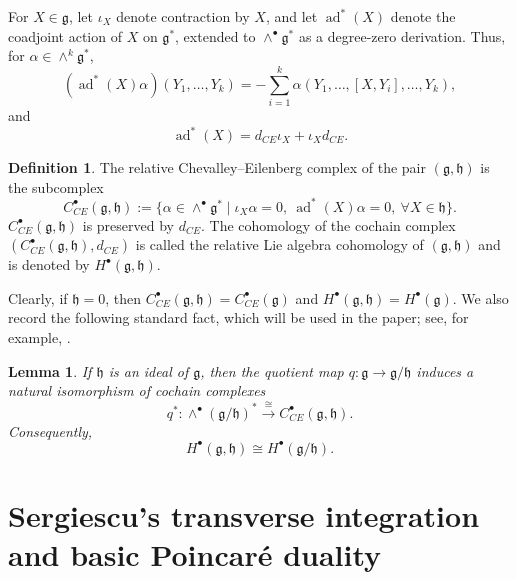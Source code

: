 \documentclass[reqno, 11pt]{amsart}
\newtheorem{lem}[thm]{Lemma}
\theoremstyle{definition}
\newtheorem{defn}[thm]{Definition}
\theoremstyle{property}
\theoremstyle{remark}
\numberwithin{equation}{section}
\begin{document}
For $X\in \mathfrak g$, let $\iota_X$ denote contraction by $X$, and let
$\operatorname{ad}^*(X)$ denote the coadjoint action of $X$ on
$\mathfrak g^*$, extended to $\wedge^\bullet \mathfrak g^*$ as a degree-zero
derivation. Thus, for $\alpha\in \wedge^k\mathfrak g^*$,
\[
(\operatorname{ad}^*(X)\alpha)(Y_1,\dots,Y_k)
=
-\sum_{i=1}^k
\alpha(Y_1,\dots,[X,Y_i],\dots,Y_k),
\]
and
\[
\operatorname{ad}^*(X)=d_{CE}\iota_X+\iota_X d_{CE}.
\]

\begin{defn}
The relative Chevalley--Eilenberg complex of the pair $(\mathfrak g,\mathfrak h)$
is the subcomplex
\[
C_{CE}^\bullet(\mathfrak g,\mathfrak h)
:=
\{\alpha\in \wedge^\bullet \mathfrak g^* \mid
\iota_X\alpha=0,\ \operatorname{ad}^*(X)\alpha=0,\ \forall X\in \mathfrak h\}.
\]
$C_{CE}^\bullet(\mathfrak g,\mathfrak h)$ is preserved by $d_{CE}$.
The cohomology of the cochain complex $(C_{CE}^\bullet(\mathfrak g,\mathfrak h),d_{CE})$
is called the relative Lie algebra cohomology of $(\mathfrak g,\mathfrak h)$ and is
denoted by $H^\bullet(\mathfrak g,\mathfrak h)$.
\end{defn}


Clearly, if $\mathfrak h=0$, then
$C_{CE}^\bullet(\mathfrak g,\mathfrak h)=C_{CE}^\bullet(\mathfrak g)$ and
$H^\bullet(\mathfrak g,\mathfrak h)=H^\bullet(\mathfrak g)$.
We also record the following standard fact, which will be used in the paper; see, for example,
\cite[Chapter III]{K88}.

\begin{lem}\label{CE-complex}
If $\mathfrak h$ is an ideal of $\mathfrak g$, then the quotient map
$q:\mathfrak g\to \mathfrak g/\mathfrak h$ induces a natural isomorphism of
cochain complexes
\[
q^*:\wedge^\bullet(\mathfrak g/\mathfrak h)^*
\xrightarrow{\;\cong\;}
C_{CE}^\bullet(\mathfrak g,\mathfrak h).
\]
Consequently,
\[
H^\bullet(\mathfrak g,\mathfrak h)\cong H^\bullet(\mathfrak g/\mathfrak h).
\]
\end{lem}






\section{Sergiescu's transverse integration and basic Poincar\'e duality} \label{integration}
\end{document}
